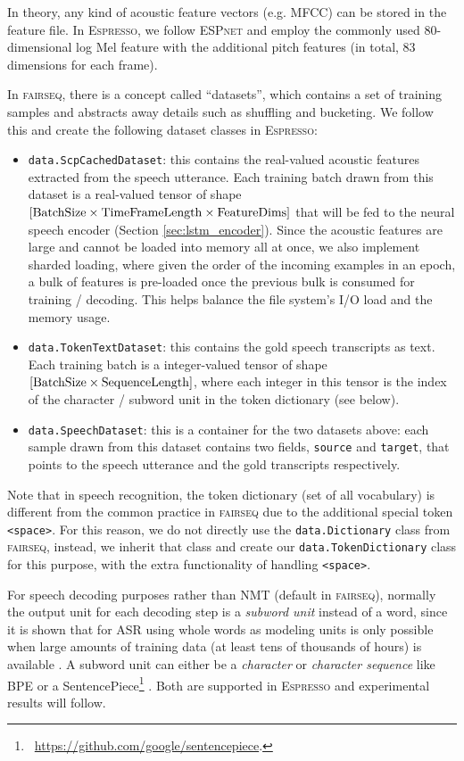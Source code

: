 \documentclass{article}
\def\espresso{\textsc{Espresso}\xspace}
\def\fairseq{\textsc{fairseq}\xspace}
\def\espnet{\textsc{ESPnet}\xspace}
\begin{document}
In theory, any kind of acoustic feature vectors (e.g. MFCC) can be stored in the feature file. In \espresso, we follow \espnet and employ the commonly used 80-dimensional log Mel feature with the additional pitch features (in total, 83 dimensions for each frame).

In \fairseq, there is a concept called ``datasets'', which contains a set of training samples and abstracts away details such as shuffling and bucketing. We follow this and create the following dataset classes in \espresso: 
\begin{itemize} \setlength\itemsep{0cm}
    \item \texttt{data.ScpCachedDataset}: this contains the real-valued acoustic features extracted from the speech utterance. Each training batch drawn from this dataset is a real-valued tensor of shape $[{\rm BatchSize} \times {\rm TimeFrameLength} \times {\rm FeatureDims}]$ that will be fed to the neural speech encoder (Section \ref{sec:lstm_encoder}). Since the acoustic features are large and cannot be loaded into memory all at once, we also implement sharded loading, where given the order of the incoming examples in an epoch, a bulk of features is pre-loaded once the previous bulk is consumed for training / decoding. This helps balance the file system's I/O load and the memory usage.
    \item \texttt{data.TokenTextDataset}: this contains the gold speech transcripts as text. Each training batch is a integer-valued tensor of shape $[{\rm BatchSize} \times {\rm SequenceLength}]$, where each integer in this tensor is the index of the character / subword unit in the token dictionary (see below).
    \item \texttt{data.SpeechDataset}: this is a container for the two datasets above: each sample drawn from this dataset contains two fields, \texttt{source} and \texttt{target}, that points to the speech utterance and the gold transcripts respectively.
\end{itemize}

\noindent Note that in speech recognition, the token dictionary (set of all vocabulary) is different from the common practice in \fairseq due to the additional special token \texttt{<space>}. For this reason, we do not directly use the \texttt{data.Dictionary} class from \fairseq, instead, we inherit that class and create our \texttt{data.TokenDictionary} class for this purpose, with the extra functionality of handling \texttt{<space>}.

For speech decoding purposes rather than NMT (default in \fairseq), normally the output unit for each decoding step is a \emph{subword unit} instead of a word, since it is shown that for ASR using whole words as modeling units is only possible when large amounts of training data (at least tens of thousands of hours) is available \cite{soltau2017neural,qudhkhasi2018building}. A subword unit can either be a \emph{character} or \emph{character sequence} like BPE \cite{sennrich2016neural} or a SentencePiece\footnote{~\url{https://github.com/google/sentencepiece}.} \cite{kudo2018subword}. Both are supported in \espresso and experimental results will follow.
\end{document}
